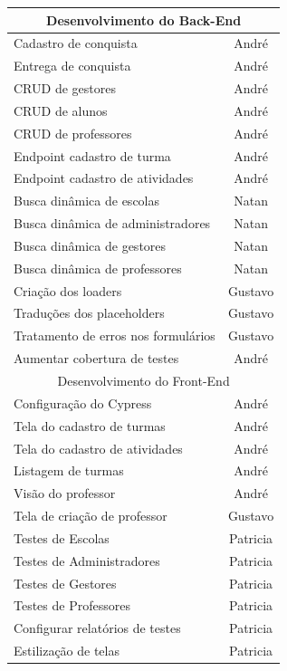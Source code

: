 \begin{apendicesenv}
\begin{quadro}[htb]
\begin{tabular}{|l|c|}
    \multicolumn{2}{|c|}{Desenvolvimento do Back-End} \\ \hline
    Cadastro de conquista & André    \\ \hline  
    Entrega de conquista & André    \\ \hline 
    CRUD de gestores & André    \\ \hline  
    CRUD de alunos & André    \\ \hline  
    CRUD de professores & André   \\ \hline 
    Endpoint cadastro de turma & André    \\ \hline
    Endpoint cadastro de atividades & André     \\ \hline  
    Busca dinâmica de escolas & Natan   \\ \hline 
    Busca dinâmica de administradores & Natan   \\ \hline 
    Busca dinâmica de gestores & Natan   \\ \hline 
    Busca dinâmica de professores & Natan   \\ \hline
    Criação dos loaders & Gustavo   \\ \hline 
    Traduções dos placeholders & Gustavo \\ \hline 
    Tratamento de erros nos formulários & Gustavo  \\ \hline 
    Aumentar cobertura de testes & André      \\ \hline 
    
    \multicolumn{2}{|c|}{Desenvolvimento do Front-End} \\ \hline
    Configuração do Cypress & André    \\ \hline 
    Tela do cadastro de turmas & André  \\ \hline 
    Tela do cadastro de atividades & André   \\ \hline
    Listagem de turmas & André \\ \hline 
    Visão do professor & André  \\ \hline 
    Tela de criação de professor & Gustavo   \\ \hline 
    Testes de Escolas & Patricia \\ \hline 
    Testes de Administradores & Patricia  \\ \hline 
    Testes de Gestores & Patricia  \\ \hline 
    Testes de Professores & Patricia  \\ \hline 
    Configurar relatórios de testes & Patricia  \\ \hline 
    Estilização de telas & Patricia \\ \hline 
    

\end{tabular}
\end{quadro}
\end{apendicesenv}

